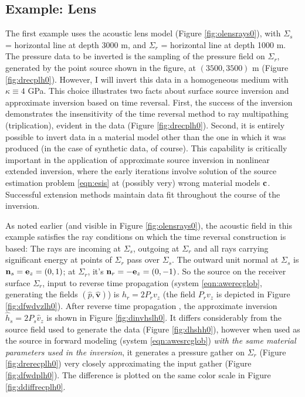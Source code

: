 \documentclass[12pt]{geophysics}
\newcommand{\bv}{\mathbf{v}}
\begin{document}
\subsection{Example: Lens}
The first example uses the acoustic lens model (Figure
\ref{fig:olensrays0}), with $\Sigma_s$ = horizontal line at depth 
3000 m, and $\Sigma_r$ = horizontal line at depth 1000 m. The pressure
data to be inverted is the sampling of the pressure field on
$\Sigma_r$, generated by the point source shown in the figure, at
$(3500, 3500)$ m (Figure \ref{fig:drecplh0}). However, I will invert
this data in a homogeneous medium with $\kappa \equiv 4$ GPa. This
choice illustrates two facts about surface source inversion and
approximate inversion based on time reversal. First, the success of the inversion demonstrates the
insensitivity of the time reversal method to ray multipathing
(triplication), evident in the data (Figure \ref{fig:drecplh0}).
Second, it is entirely possible to invert data in a material model
other than the one in which it was produced (in the case of synthetic
data, of course). This
capability is critically important in the application of 
approximate source inversion in nonlinear extended inversion, where the early iterations
involve solution of the source estimation problem \ref{eqn:esis} at
(possibly very) wrong material models ${\bf c}$. Successful extension
methods maintain data fit throughout the course of the inversion.

As noted earlier (and visible in Figure \ref{fig:olensrays0}), the acoustic field in this example satisfies the ray
conditions on which the time reversal construction is based: The rays
are incoming at $\Sigma_s$, outgoing at $\Sigma_r$ and all rays
carrying significant energy at points of $\Sigma_r$ pass over
$\Sigma_s$. The outward unit normal at $\Sigma_s$ is ${\bf n}_s ={\bf
  e}_z=(0,1)$; at $\Sigma_r$, it's ${\bf n}_r =-{\bf
  e}_z=(0,-1)$. So the source on the receiver surface $\Sigma_r$, input to reverse time propagation
(system \ref{eqn:awerecglob}, generating the fields $(\hat{p},\hat{\bv})$) is
$h_r=2P_rv_z$ (the field $P_rv_z$ is depicted in Figure \ref{fig:dfwdvzlh0}). After reverse time propagation , the approximate
inversion $\hat{h}_s=2P_s\hat{v}_z$ is shown in Figure
\ref{fig:dinvhslh0}. It differs considerably from the source field used to
generate the data (Figure \ref{fig:dhshh0}), however when used as the
source in forward modeling (system \ref{eqn:awesrcglob}) {\em with the
  same material parameters used in the inversion}, it generates a
pressure gather on $\Sigma_r$ (Figure \ref{fig:drerecplh0}) very
closely 
approximating the input gather (Figure \ref{fig:dfwdplh0}). The
difference is plotted on the same color scale in Figure
\ref{fig:ddiffrecplh0}.
\end{document}
